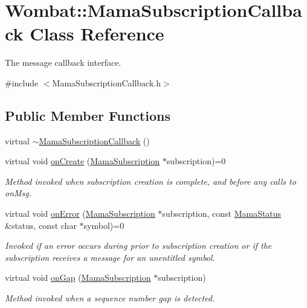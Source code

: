 \hypertarget{classWombat_1_1MamaSubscriptionCallback}{
\section{Wombat::MamaSubscriptionCallback Class Reference}
\label{classWombat_1_1MamaSubscriptionCallback}
}


The message callback interface.  


{\ttfamily \#include $<$MamaSubscriptionCallback.h$>$}\subsection*{Public Member Functions}
\begin{DoxyCompactItemize}
\item 
virtual \hyperlink{classWombat_1_1MamaSubscriptionCallback_ace64014ad0b2b7d79395a50de562c94b}{$\sim$MamaSubscriptionCallback} ()
\item 
virtual void \hyperlink{classWombat_1_1MamaSubscriptionCallback_a9cdbf8347dcb5110a5f9755c83276fd4}{onCreate} (\hyperlink{classWombat_1_1MamaSubscription}{MamaSubscription} $\ast$subscription)=0
\begin{DoxyCompactList}\small\item\em Method invoked when subscription creation is complete, and before any calls to {\ttfamily onMsg}. \item\end{DoxyCompactList}\item 
virtual void \hyperlink{classWombat_1_1MamaSubscriptionCallback_ab325050a90c83590c31da66114858c44}{onError} (\hyperlink{classWombat_1_1MamaSubscription}{MamaSubscription} $\ast$subscription, const \hyperlink{classWombat_1_1MamaStatus}{MamaStatus} \&status, const char $\ast$symbol)=0
\begin{DoxyCompactList}\small\item\em Invoked if an error occurs during prior to subscription creation or if the subscription receives a message for an unentitled symbol. \item\end{DoxyCompactList}\item 
virtual void \hyperlink{classWombat_1_1MamaSubscriptionCallback_adfc75192ce4b29bc9ba32daaadd62c88}{onGap} (\hyperlink{classWombat_1_1MamaSubscription}{MamaSubscription} $\ast$subscription)
\begin{DoxyCompactList}\small\item\em Method invoked when a sequence number gap is detected. \item\end{DoxyCompactList}\item 

\end{DoxyCompactItemize}
